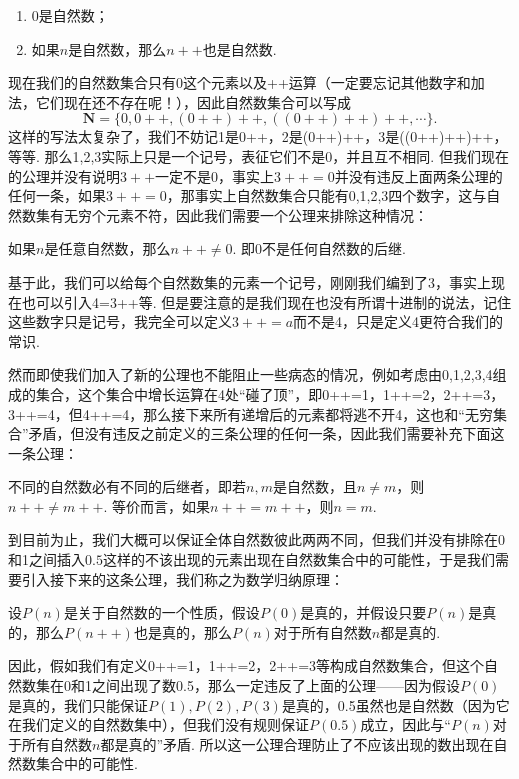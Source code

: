 \begin{axiom*}
    \begin{enumerate}
        \item 0是自然数；
        \item 如果$n$是自然数，那么$n++$也是自然数.
    \end{enumerate}
\end{axiom*}

现在我们的自然数集合只有0这个元素以及++运算（一定要忘记其他数字和加法，它们现在还不存在呢！），因此自然数集合可以写成
\[\mathbf{N}=\{0,0++,(0++)++,((0++)++)++,\cdots\}.\]
这样的写法太复杂了，我们不妨记1是0++，2是(0++)++，3是((0++)++)++，等等. 那么1,2,3实际上只是一个记号，表征它们不是0，并且互不相同. 但我们现在的公理并没有说明$3++$一定不是0，事实上$3++=0$并没有违反上面两条公理的任何一条，如果$3++=0$，那事实上自然数集合只能有0,1,2,3四个数字，这与自然数集有无穷个元素不符，因此我们需要一个公理来排除这种情况：

\begin{axiom*}
    如果$n$是任意自然数，那么$n++\neq 0$. 即0不是任何自然数的后继.
\end{axiom*}

基于此，我们可以给每个自然数集的元素一个记号，刚刚我们编到了3，事实上现在也可以引入4=3++等. 但是要注意的是我们现在也没有所谓十进制的说法，记住这些数字只是记号，我完全可以定义$3++=a$而不是4，只是定义4更符合我们的常识.

然而即使我们加入了新的公理也不能阻止一些病态的情况，例如考虑由0,1,2,3,4组成的集合，这个集合中增长运算在4处``碰了顶''，即0++=1，1++=2，2++=3，3++=4，但4++=4，那么接下来所有递增后的元素都将逃不开4，这也和``无穷集合''矛盾，但没有违反之前定义的三条公理的任何一条，因此我们需要补充下面这一条公理：

\begin{axiom*}
    不同的自然数必有不同的后继者，即若$n,m$是自然数，且$n\neq m$，则$n++\neq m++$. 等价而言，如果$n++=m++$，则$n=m$.
\end{axiom*}

到目前为止，我们大概可以保证全体自然数彼此两两不同，但我们并没有排除在0和1之间插入$0.5$这样的不该出现的元素出现在自然数集合中的可能性，于是我们需要引入接下来的这条公理，我们称之为数学归纳原理：

\begin{axiom*}
    设$P(n)$是关于自然数的一个性质，假设$P(0)$是真的，并假设只要$P(n)$是真的，那么$P(n++)$也是真的，那么$P(n)$对于所有自然数$n$都是真的.
\end{axiom*}

因此，假如我们有定义0++=1，1++=2，2++=3等构成自然数集合，但这个自然数集在0和1之间出现了数0.5，那么一定违反了上面的公理——因为假设$P(0)$是真的，我们只能保证$P(1),P(2),P(3)$是真的，0.5虽然也是自然数（因为它在我们定义的自然数集中），但我们没有规则保证$P(0.5)$成立，因此与``$P(n)$对于所有自然数$n$都是真的''矛盾. 所以这一公理合理防止了不应该出现的数出现在自然数集合中的可能性.

